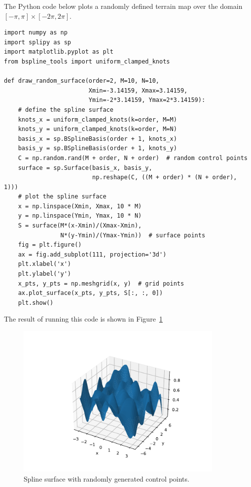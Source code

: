 The Python code below plots a randomly defined terrain map over the domain $[-\pi, \pi]\times[-2\pi, 2\pi]$.
\begin{lstlisting}
import numpy as np
import splipy as sp
import matplotlib.pyplot as plt
from bspline_tools import uniform_clamped_knots

def draw_random_surface(order=2, M=10, N=10,
                        Xmin=-3.14159, Xmax=3.14159,
                        Ymin=-2*3.14159, Ymax=2*3.14159):
    # define the spline surface
    knots_x = uniform_clamped_knots(k=order, M=M)
    knots_y = uniform_clamped_knots(k=order, M=N)
    basis_x = sp.BSplineBasis(order + 1, knots_x)
    basis_y = sp.BSplineBasis(order + 1, knots_y)
    C = np.random.rand(M + order, N + order)  # random control points
    surface = sp.Surface(basis_x, basis_y,
                         np.reshape(C, ((M + order) * (N + order), 1)))
    # plot the spline surface
    x = np.linspace(Xmin, Xmax, 10 * M)
    y = np.linspace(Ymin, Ymax, 10 * N)
    S = surface(M*(x-Xmin)/(Xmax-Xmin),
                N*(y-Ymin)/(Ymax-Ymin))  # surface points
    fig = plt.figure()
    ax = fig.add_subplot(111, projection='3d')
    plt.xlabel('x')
    plt.ylabel('y')
    x_pts, y_pts = np.meshgrid(x, y)  # grid points
    ax.plot_surface(x_pts, y_pts, S[:, :, 0])
    plt.show()
\end{lstlisting}
The result of running this code is shown in Figure~\ref{fig:random_spline_surface}
\begin{figure}[hbt]
  \centering\includegraphics[width=0.9\textwidth]{./chap5_trajectory_planning/figures/random_spline_surface}
  \caption{Spline surface with randomly generated control points.}
  \label{fig:random_spline_surface}  
\end{figure}




